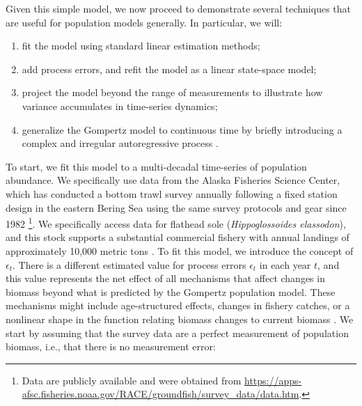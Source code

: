 Given this simple model, we now proceed to demonstrate several techniques that are useful for population models generally.  In particular, we will:
\begin{enumerate}
    \item fit the model using standard linear estimation methods;

    \item add process errors, and refit the model as a linear state-space model;
    
    \item project the model beyond the range of measurements to illustrate how variance accumulates in time-series dynamics;
    
    \item generalize the Gompertz model to continuous time by briefly introducing a complex and irregular autoregressive process \cite{dennis_density-dependent_2014,elorrieta_discrete-time_2019}.
\end{enumerate}

To start, we fit this model to a multi-decadal time-series of population abundance.  We specifically use data from the Alaska Fisheries Science Center, which has conducted a bottom trawl survey annually following a fixed station design in the eastern Bering Sea using the same survey protocols and gear since 1982 \cite{lauth_results_2016}\footnote{Data are publicly available and were obtained from \url{https://apps-afsc.fisheries.noaa.gov/RACE/groundfish/survey_data/data.htm}.}.  We specifically access data for flathead sole (\textit{Hippoglossoides elassodon}), and this stock supports a substantial commercial fishery with annual landings of approximately 10,000 metric tons \cite{monnahan_assessment_2020}.  To fit this model, we introduce the concept of  \( \epsilon_t \).  There is a different estimated value for process errors \(\epsilon_t\) in each year \(t\), and this value represents the net effect of all mechanisms that affect changes in biomass beyond what is predicted by the Gompertz population model. These mechanisms might include age-structured effects, changes in fishery catches, or a nonlinear shape in the function relating biomass changes to current biomass \cite{thorson_bayesian_2014}. We start by assuming that the survey data are a perfect measurement of population biomass, i.e., that there is no measurement error:

